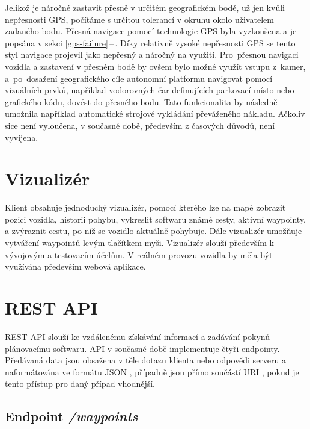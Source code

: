 \documentclass[czech, bachelor]{diploma}
\newcommand{\peteref}[1]{\ref{#1}\,--\,\nameref{#1}}
\begin{document}
Jelikož je náročné zastavit přesně v určitém geografickém bodě, už jen kvůli nepřesnosti GPS, počítáme s určitou tolerancí
v okruhu okolo uživatelem zadaného bodu. Přesná navigace pomocí technologie GPS byla vyzkoušena a je popsána v sekci
\peteref{gps-failure}. Díky relativně vysoké nepřesnosti GPS se tento styl navigace projevil jako nepřesný a náročný na využití.
Pro~přesnou navigaci vozidla a zastavení v přesném bodě by ovšem bylo možné využít vstupu z~kamer, a~po~dosažení geografického
cíle autonomní platformu navigovat pomocí vizuálních prvků, například vodorovných čar definujících parkovací místo nebo
grafického kódu, dovést do přesného bodu. Tato funkcionalita by následně umožnila například automatické strojové vykládání
převáženého nákladu. Ačkoliv sice není vyloučena, v současné době, především z časových důvodů, není vyvíjena.

\section{Vizualizér} \label{visualizer}

Klient obsahuje jednoduchý vizualizér, pomocí kterého lze na mapě zobrazit pozici vozidla, historii pohybu, vykreslit
softwaru známé cesty, aktivní waypointy, a zvýraznit cestu, po níž se vozidlo aktuálně pohybuje. Dále vizualizér umožňuje
vytváření waypointů levým tlačítkem myši. Vizualizér slouží především k vývojovým a testovacím účelům. V reálném provozu vozidla
by měla být využívána především webová aplikace.

\section{REST API} \label{rest-api}

REST API \cite{rest-source} slouží ke vzdálenému získávání informací a zadávání pokynů plánovacímu softwaru. API v současné době 
implementuje čtyři endpointy. Předávaná data jsou obsažena v těle dotazu klienta nebo odpovědi serveru a naformátována ve formátu
JSON \cite{json-source}, případně jsou přímo součástí URI \cite{http-source}, pokud je tento přístup pro daný případ vhodnější.

\subsection{Endpoint \emph{/waypoints}}
\end{document}

